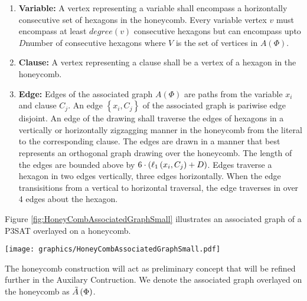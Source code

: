 \begin{enumerate}
\item \textbf{Variable:} A vertex representing a variable shall encompass a horizontally consecutive set of hexagons in the honeycomb. 
Every variable vertex $v$  must encompass at least $degree(v)$ consecutive hexagons but can encompass upto $D$number of consecutive hexagons where $V$ is the set of vertices in $A(\Phi)$.
\item \textbf{Clause:} A vertex representing a clause shall be a vertex of a hexagon in the honeycomb.
\item \textbf{Edge:} Edges of the associated graph $A(\Phi)$ are paths from the variable $x_i$ and clause $C_j$.  An edge $\left\lbrace x_i, C_j \right\rbrace$ of the associated graph is pariwise edge disjoint. 
An edge of the drawing shall traverse the edges of hexagons in a vertically or horizontally zigzagging manner in the honeycomb from the literal to the corresponding clause. 
The edges are drawn in a manner that best represents an orthogonal graph drawing over the honeycomb.  
The length of the edges are bounded above by $6 \cdot \left( \ell_1 \left( x_i,C_j \right) + D \right)$. Edges traverse a hexagon in two edges vertically, three edges horizontally.
  When the edge transisitions from a vertical to horizontal traversal, the edge traverses in over 4 edges about the hexagon.
\end{enumerate}
Figure \ref{fig:HoneyCombAssociatedGraphSmall} illustrates an associated graph of a P3SAT overlayed on a honeycomb.

\begin{minipage}{\linewidth}
\begin{center}
\texttt{[image: graphics/HoneyCombAssociatedGraphSmall.pdf]}
\label{fig:HoneyCombAssociatedGraphSmall}
\end{center}
\end{minipage}

The honeycomb construction will act as preliminary concept that will be refined further in the Auxilary Contruction.
We denote the associated graph overlayed on the honeycomb as $\tilde{A}\left( \Phi \right)$.